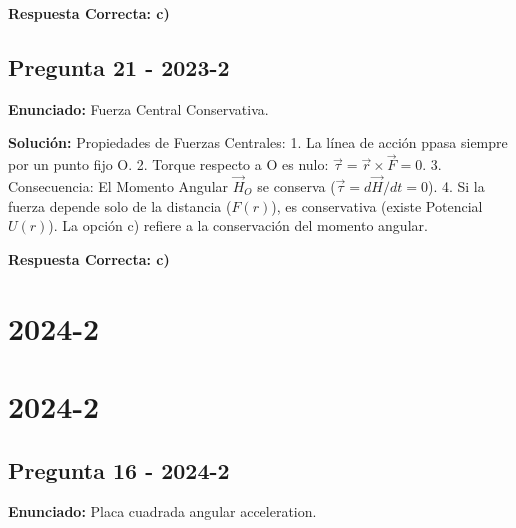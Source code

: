 \documentclass{article}
\begin{document}
\textbf{Respuesta Correcta: c)}

\vspace{0.5cm}

\subsection*{Pregunta 21 - 2023-2}
\textbf{Enunciado:} Fuerza Central Conservativa.

\textbf{Solución:}
Propiedades de Fuerzas Centrales:
1. La línea de acción ppasa siempre por un punto fijo O.
2. Torque respecto a O es nulo: $\vec{\tau} = \vec{r} \times \vec{F} = 0$.
3. Consecuencia: El Momento Angular $\vec{H}_O$ se conserva ($\vec{\tau} = d\vec{H}/dt = 0$).
4. Si la fuerza depende solo de la distancia ($F(r)$), es conservativa (existe Potencial $U(r)$).
La opción c) refiere a la conservación del momento angular.

\noindent{}

\textbf{Respuesta Correcta: c)}

\vspace{0.5cm}

\section{2024-2}

\section{2024-2}

\subsection*{Pregunta 16 - 2024-2}
\textbf{Enunciado:} Placa cuadrada angular acceleration.
\end{document}
